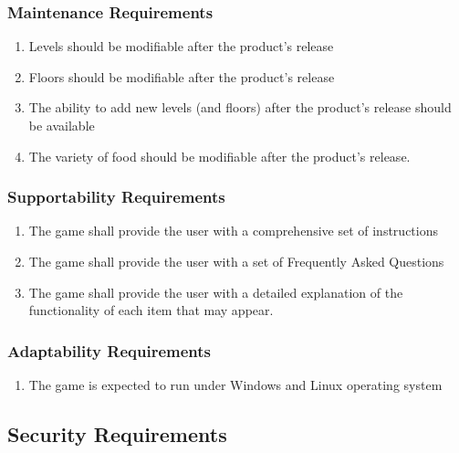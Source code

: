 \documentclass[12pt, titlepage]{article}
\begin{document}
\subsubsection{Maintenance Requirements}
\label{ssub:maintenance_requirements}
\begin{enumerate}[{MS}1. ]
        \item Levels should be modifiable after the product's release
        \item Floors should be modifiable after the product's release
        \item The ability to add new levels (and floors) after the product's release should be available
        \item The variety of food should be modifiable after the product's release.
\end{enumerate}

\subsubsection{Supportability Requirements}
\label{ssub:supportability_requirements}
\begin{enumerate}[start=5,label={ MS\arabic*.}]
        \item The game shall provide the user with a comprehensive set of instructions
        \item The game shall provide the user with a set of Frequently Asked Questions
        \item The game shall provide the user with a detailed explanation of the functionality of each item that may appear.
\end{enumerate}

\subsubsection{Adaptability Requirements}
\label{ssub:adaptability_requirements}
\begin{enumerate}[start=8,label={ MS\arabic*.} ]
        \item The game is expected to run under Windows and Linux operating system
\end{enumerate}


\subsection{Security Requirements}
\label{sub:security_requirements}
\end{document}
